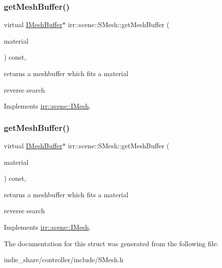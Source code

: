 \subsubsection{\texorpdfstring{get\+Mesh\+Buffer()}{getMeshBuffer()}\hspace{0.1cm}{\footnotesize\ttfamily [1/2]}}
{\footnotesize\ttfamily virtual \hyperlink{classirr_1_1scene_1_1IMeshBuffer}{I\+Mesh\+Buffer}$\ast$ irr\+::scene\+::\+S\+Mesh\+::get\+Mesh\+Buffer (\begin{DoxyParamCaption}\item[{const \hyperlink{classirr_1_1video_1_1SMaterial}{video\+::\+S\+Material} \&}]{material }\end{DoxyParamCaption}) const\hspace{0.3cm}{\ttfamily [inline]}, {\ttfamily [virtual]}}



returns a meshbuffer which fits a material 

reverse search 

Implements \hyperlink{classirr_1_1scene_1_1IMesh_a9573dace82efb01ba1f35f9cc28a4ced}{irr\+::scene\+::\+I\+Mesh}.

\mbox{\label{structirr_1_1scene_1_1SMesh_a768eeba9148e949d6962bee08517a056}} 
\subsubsection{\texorpdfstring{get\+Mesh\+Buffer()}{getMeshBuffer()}\hspace{0.1cm}{\footnotesize\ttfamily [2/2]}}
{\footnotesize\ttfamily virtual \hyperlink{classirr_1_1scene_1_1IMeshBuffer}{I\+Mesh\+Buffer}$\ast$ irr\+::scene\+::\+S\+Mesh\+::get\+Mesh\+Buffer (\begin{DoxyParamCaption}\item[{const \hyperlink{classirr_1_1video_1_1SMaterial}{video\+::\+S\+Material} \&}]{material }\end{DoxyParamCaption}) const\hspace{0.3cm}{\ttfamily [inline]}, {\ttfamily [virtual]}}



returns a meshbuffer which fits a material 

reverse search 

Implements \hyperlink{classirr_1_1scene_1_1IMesh_a9573dace82efb01ba1f35f9cc28a4ced}{irr\+::scene\+::\+I\+Mesh}.



The documentation for this struct was generated from the following file\+:\begin{DoxyCompactItemize}
\item 
indie\+\_\+share/controller/include/S\+Mesh.\+h\end{DoxyCompactItemize}
